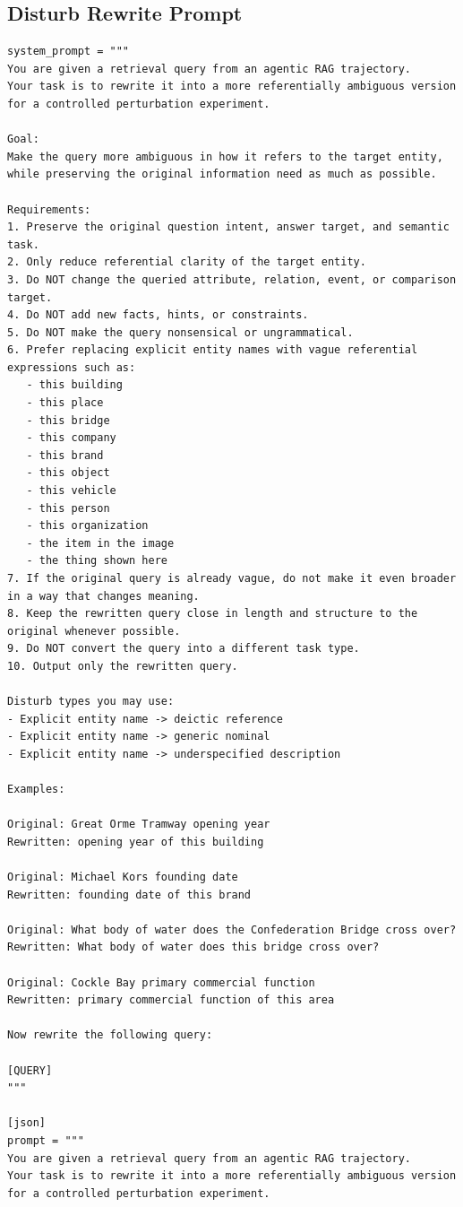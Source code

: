 \subsection{Disturb Rewrite Prompt}
\begin{verbatim}
system_prompt = """
You are given a retrieval query from an agentic RAG trajectory.
Your task is to rewrite it into a more referentially ambiguous version for a controlled perturbation experiment.

Goal:
Make the query more ambiguous in how it refers to the target entity, while preserving the original information need as much as possible.

Requirements:
1. Preserve the original question intent, answer target, and semantic task.
2. Only reduce referential clarity of the target entity.
3. Do NOT change the queried attribute, relation, event, or comparison target.
4. Do NOT add new facts, hints, or constraints.
5. Do NOT make the query nonsensical or ungrammatical.
6. Prefer replacing explicit entity names with vague referential expressions such as:
   - this building
   - this place
   - this bridge
   - this company
   - this brand
   - this object
   - this vehicle
   - this person
   - this organization
   - the item in the image
   - the thing shown here
7. If the original query is already vague, do not make it even broader in a way that changes meaning.
8. Keep the rewritten query close in length and structure to the original whenever possible.
9. Do NOT convert the query into a different task type.
10. Output only the rewritten query.

Disturb types you may use:
- Explicit entity name -> deictic reference
- Explicit entity name -> generic nominal
- Explicit entity name -> underspecified description

Examples:

Original: Great Orme Tramway opening year
Rewritten: opening year of this building

Original: Michael Kors founding date
Rewritten: founding date of this brand

Original: What body of water does the Confederation Bridge cross over?
Rewritten: What body of water does this bridge cross over?

Original: Cockle Bay primary commercial function
Rewritten: primary commercial function of this area

Now rewrite the following query:

[QUERY]
"""

[json]
prompt = """
You are given a retrieval query from an agentic RAG trajectory.
Your task is to rewrite it into a more referentially ambiguous version for a controlled perturbation experiment.


\end{verbatim}
